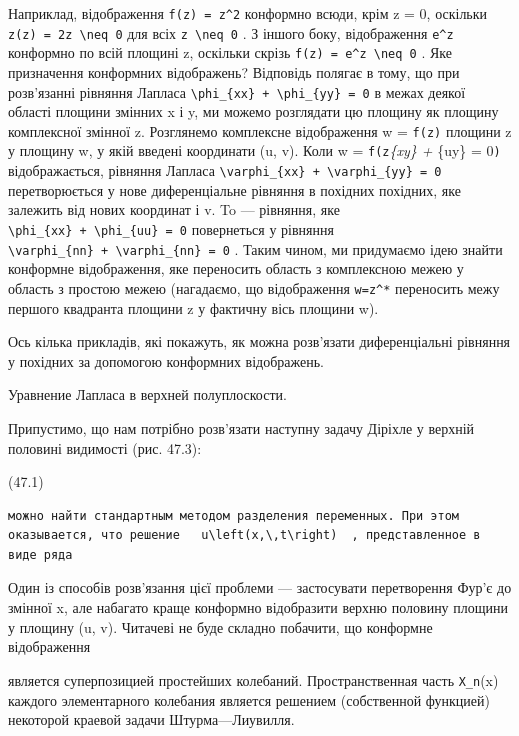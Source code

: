 \documentclass[
  ukrainian,
]{article}
\begin{document}
Наприклад, відображення \texttt{f(z)\ =\ z\^{}2} конформно всюди, крім z
= 0, оскільки
\texttt{z\textquotesingle{}(z)\ =\ 2z\ \textbackslash{}neq\ 0} для всіх
\texttt{z\ \textbackslash{}neq\ 0} . З іншого боку, відображення
\texttt{e\^{}z} конформно по всій площині z, оскільки скрізь
\texttt{f\textquotesingle{}(z)\ =\ e\^{}z\ \textbackslash{}neq\ 0} . Яке
призначення конформних відображень? Відповідь полягає в тому, що при
розв'язанні рівняння Лапласа
\texttt{\textbackslash{}phi\_\{xx\}\ +\ \textbackslash{}phi\_\{yy\}\ =\ 0}
в межах деякої області площини змінних x і y, ми можемо розглядати цю
площину як площину комплексної змінної z. Розглянемо комплексне
відображення w = \texttt{f(z)} площини z у площину w, у якій введені
координати (u, v). Коли w = \texttt{f(z}\phi\emph{\{xy\} + \phi}\{uy\} =
0\texttt{)} відображається, рівняння Лапласа
\texttt{\textbackslash{}varphi\_\{xx\}\ +\ \textbackslash{}varphi\_\{yy\}\ =\ 0}
перетворюється у нове диференціальне рівняння в похідних похідних, яке
залежить від нових координат і v. To --- рівняння, яке
\texttt{\textbackslash{}phi\_\{xx\}\ +\ \textbackslash{}phi\_\{uu\}\ =\ 0}
повернеться у рівняння
\texttt{\textbackslash{}varphi\_\{nn\}\ +\ \textbackslash{}varphi\_\{nn\}\ =\ 0}
. Таким чином, ми придумаємо ідею знайти конформне відображення, яке
переносить область з комплексною межею у область з простою межею
(нагадаємо, що відображення \texttt{w=z\^{}*} переносить межу першого
квадранта площини z у фактичну вісь площини w).

Ось кілька прикладів, які покажуть, як можна розв'язати диференціальні
рівняння у похідних за допомогою конформних відображень.

Уравнение Лапласа в верхней полуплоскости.

Припустимо, що нам потрібно розв'язати наступну задачу Діріхле у верхній
половині видимості (рис. 47.3):

(47.1)

\begin{verbatim}
можно найти стандартным методом разделения переменных. При этом оказывается, что решение   u\left(x,\,t\right)  , представленное в виде ряда
\end{verbatim}

Один із способів розв'язання цієї проблеми --- застосувати перетворення
Фур'є до змінної x, але набагато краще конформно відобразити верхню
половину площини у площину (u, v). Читачеві не буде складно побачити, що
конформне відображення

является суперпозицией простейших колебаний. Пространственная часть
\texttt{X\_n}(x) каждого элементарного колебания является решением
(собственной функцией) некоторой краевой задачи Штурма---Лиувилля.
\end{document}
